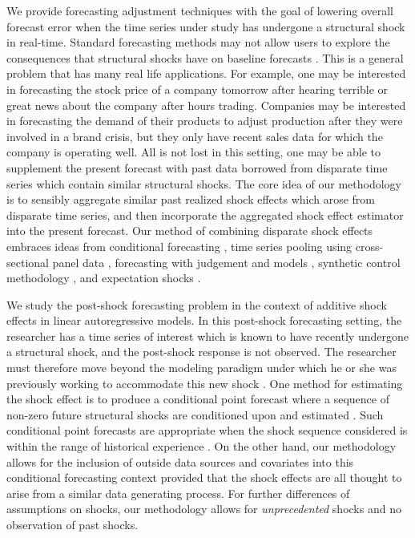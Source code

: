 \documentclass[11pt]{article}
\theoremstyle{definition}
\begin{document}
We provide forecasting adjustment techniques with the goal of lowering overall forecast error when the time series under study has undergone a structural shock in real-time. Standard forecasting methods may not allow users to explore the consequences that structural shocks have on baseline forecasts \citep{baumeister2014real}. This is a general problem that has many real life applications. For example, one may be interested in forecasting the stock price of a company tomorrow after hearing terrible or great news about the company  after hours trading. Companies may be interested in forecasting the demand of their products to adjust production after they were involved in a brand crisis, but they only have recent sales data for which the company is operating well. All is not lost in this setting, one may be able to supplement the present forecast with past data borrowed from disparate time series which contain similar structural shocks. The core idea of our methodology is to sensibly aggregate similar past realized shock effects which arose from disparate time series, and then incorporate the aggregated shock effect estimator into the present forecast. Our method of combining disparate shock effects embraces ideas from conditional forecasting \citep{baumeister2014real, kilian2017structural}, time series pooling using cross-sectional panel data \citep{ramaswamy1993empirical, pesaran1999pooled, hoogstrate2000pooling, baltagi2008forecasting, koop2012forecasting, liu2020forecasting}, forecasting with judgement and models \citep{svensson2005monetary, monti2008forecast}, synthetic control methodology \citep{abadie2010synthetic, agarwal2020two}, and expectation shocks \citep{croushore2006data, baumeister2014general, clements2019measuring}. 

We study the post-shock forecasting problem in the context of additive shock effects in linear autoregressive models. In this post-shock forecasting setting, the researcher has a time series of interest which is known to have recently undergone a structural shock, and the post-shock response is not observed. The researcher must therefore move beyond the modeling paradigm under which he or she was previously working  to accommodate this new shock \citep{monti2008forecast, svensson2005monetary}. One method for estimating the shock effect is to produce a conditional point forecast where a sequence of non-zero future structural shocks are conditioned upon and estimated \citep{baumeister2014real}. Such conditional point forecasts are appropriate when the shock sequence considered is within the range of historical experience \citep{kilian2017structural}. On the other hand, our methodology allows for the inclusion of outside data sources and covariates into this conditional forecasting context provided that the shock effects are all thought to arise from a similar data generating process. For further differences of assumptions on shocks, our methodology allows for \emph{unprecedented} shocks and no observation of past shocks. 
\end{document}
